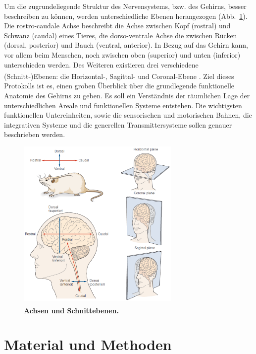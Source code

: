 \documentclass[12pt,a4paper,pdftex]{article}
\begin{document}
Um die zugrundeliegende Struktur des Nervensystems, bzw. des Gehirns, besser beschreiben zu können, werden unterschiedliche Ebenen herangezogen (Abb.~\ref{fig:schnittebenen}). Die rostro-caudale Achse beschreibt die Achse zwischen Kopf (rostral) und Schwanz (caudal) eines Tieres, die dorso-ventrale Achse die zwischen Rücken (dorsal, posterior) und Bauch (ventral, anterior). In Bezug auf das Gehirn kann, vor allem beim Menschen, noch zwischen oben (superior) und unten (inferior) unterschieden werden. Des Weiteren existieren drei verschiedene (Schnitt-)Ebenen: die Horizontal-, Sagittal- und Coronal-Ebene \textsuperscript{\cite[15]{kandel2013principles}}. Ziel dieses Protokolls ist es, einen groben Überblick über die grundlegende funktionelle Anatomie des Gehirns zu geben. Es soll ein Verständnis der räumlichen Lage der unterschiedlichen Areale und funktionellen Systeme entstehen. Die wichtigsten funktionellen Untereinheiten, sowie die sensorischen und motorischen Bahnen, die integrativen Systeme und die generellen Transmittersysteme sollen genauer beschrieben werden.

\begin{figure}[H]
    \centering
    \includegraphics[width=0.7\textwidth]{pictures/Bilder_Jule/Andere/Schnittebenen.png}
    \caption[Achsen und Schnittebenen]{\textbf{Achsen und Schnittebenen.} \textsuperscript{\cite[15]{kandel2013principles}}}
    \label{fig:schnittebenen}
\end{figure}{}


\newpage
\section{Material und Methoden}
\end{document}
